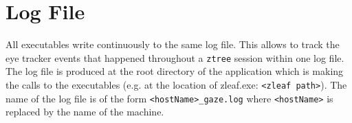 \documentclass[a4paper,oneside]{book}
\begin{document}
\section{Log File}
All executables write continuously to the same log file.
This allows to track the eye tracker events that happened throughout a \texttt{ztree} session within one log file.
The log file is produced at the root directory of the application which is making the calls to the executables (e.g. at the location of zleaf.exe: \texttt{<zleaf path>}).
The name of the log file is of the form \texttt{<hostName>\_gaze.log} where \texttt{<hostName>} is replaced by the name of the machine.
\end{document}
